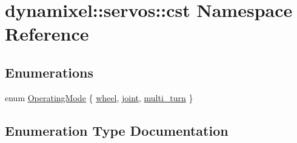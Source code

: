 \hypertarget{namespacedynamixel_1_1servos_1_1cst}{}\section{dynamixel\+:\+:servos\+:\+:cst Namespace Reference}
\label{namespacedynamixel_1_1servos_1_1cst}
\subsection*{Enumerations}
\begin{DoxyCompactItemize}
\item 
enum \hyperlink{namespacedynamixel_1_1servos_1_1cst_ac17b5608f65c6495114d34f8efc4d809}{Operating\+Mode} \{ \hyperlink{namespacedynamixel_1_1servos_1_1cst_ac17b5608f65c6495114d34f8efc4d809a01e3275de344ad8e2011c6acda431280}{wheel}, 
\hyperlink{namespacedynamixel_1_1servos_1_1cst_ac17b5608f65c6495114d34f8efc4d809a1fdfcfad31f04d24b25c0842e9d99c48}{joint}, 
\hyperlink{namespacedynamixel_1_1servos_1_1cst_ac17b5608f65c6495114d34f8efc4d809ac4453992c6d6fcd9a66eb6331fd8c945}{multi\+\_\+turn}
 \}
\end{DoxyCompactItemize}


\subsection{Enumeration Type Documentation}
